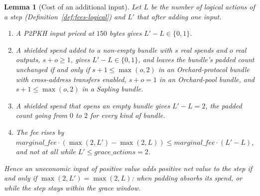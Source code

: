 \documentclass[11pt,a4paper]{article}
\newtheorem{lemma}[theorem]{Lemma}
\theoremstyle{definition}
\begin{document}
\begin{lemma}[Cost of an additional input]\label{lem:sel-uneconomic}
Let $L$ be the number of logical actions of a step
(Definition~\ref{def:fees-logical}) and $L'$ that after adding one input.
\begin{enumerate}[label=(\roman*)]
\item A P2PKH input priced at $150$ bytes gives $L' - L \in \{0, 1\}$.
\item A shielded spend added to a non-empty bundle with $s$ real spends and
  $o$ real outputs, $s + o \ge 1$, gives $L' - L \in \{0, 1\}$, and leaves
  the bundle's padded count unchanged if and only if $s + 1 \le \max(o, 2)$
  in an Orchard-protocol bundle with cross-address transfers enabled, $s + o
  = 1$ in an Orchard-pool bundle, and $s + 1 \le \max(o, 2)$ in a Sapling
  bundle.
\item A shielded spend that opens an empty bundle gives $L' - L = 2$, the
  padded count going from $0$ to $2$ for every kind of bundle.
\item The fee rises by $\mathit{marginal\_fee} \cdot (\max(2, L') -
  \max(2, L)) \le \mathit{marginal\_fee} \cdot (L' - L)$, and not at all
  while $L' \le \mathit{grace\_actions} = 2$.
\end{enumerate}
Hence an uneconomic input of positive value adds positive net value to the
step if and only if $\max(2, L') = \max(2, L)$: when padding absorbs its
spend, or while the step stays within the grace window.
\end{lemma}
\end{document}
